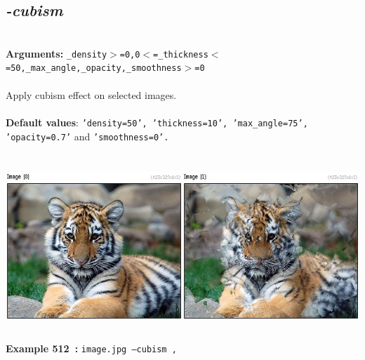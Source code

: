 \documentclass[a4paper,11pt,twoside]{book}
\begin{document}
\subsection{\emph{-cubism} }\vspace*{-0.5em}
~\\\textbf{Arguments: } 
{\small \texttt{\_density$>$=0,0$<$=\_thickness$<$=50,\_max\_angle,\_opacity,\_smoothness$>$=0}}\\~\\
Apply cubism effect on selected images.
~\\~\\\textbf{Default values}: {\small \texttt{'density=50', 'thickness=10', 'max\_angle=75', 'opacity=0.7'} and \texttt{'smoothness=0'.}}
\begin{center}\includegraphics[keepaspectratio=true,height=7cm,width=\textwidth]{img/gmic_def512.jpg}\\
{\footnotesize \textbf{Example 512~:} \texttt{image.jpg --cubism ,}}
\end{center}
\end{document}
